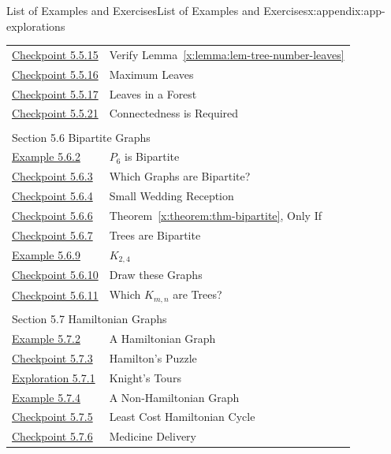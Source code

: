 \documentclass[oneside,10pt,]{book}
\newcommand{\xreffont}{\relax}
\numberwithin{equation}{section}
\begin{document}
\begin{appendixptx}{List of Examples and Exercises}{}{List of Examples and Exercises}{}{}{x:appendix:app-explorations}
\begin{longtable}[l]{ll}
\hyperref[x:exercise:ex-verify-lemma-leaves]{Checkpoint 5.5.15}& Verify Lemma~{\xreffont\ref*{x:lemma:lem-tree-number-leaves}}\\
\hyperref[x:exercise:ex-max-leaves]{Checkpoint 5.5.16}& Maximum Leaves\\
\hyperref[x:exercise:ex-min-max-leaves-forest]{Checkpoint 5.5.17}& Leaves in a Forest\\
\hyperref[x:exercise:ex-not-a-tree]{Checkpoint 5.5.21}& Connectedness is Required\\
\multicolumn{2}{l}{\null}\\[1.5ex] \multicolumn{2}{l}{\large Section 5.6 Bipartite Graphs}\\[0.5ex]
\hyperref[x:example:eg-bipartite]{Example 5.6.2}& \(P_6\) is Bipartite\\
\hyperref[x:exercise:ex-which-bipartite]{Checkpoint 5.6.3}& Which Graphs are Bipartite?\\
\hyperref[x:exercise:ex-explain-g8-bipartite]{Checkpoint 5.6.4}& Small Wedding Reception\\
\hyperref[x:exercise:ex-bipartite-only-if]{Checkpoint 5.6.6}& Theorem~{\xreffont\ref*{x:theorem:thm-bipartite}}, Only If\\
\hyperref[x:exercise:ex-tree-bipartite]{Checkpoint 5.6.7}& Trees are Bipartite\\
\hyperref[x:example:eg-complete-bipartite]{Example 5.6.9}& \(K_{2,4}\)\\
\hyperref[x:exercise:ex-draw-complete-bipartite]{Checkpoint 5.6.10}& Draw these Graphs\\
\hyperref[x:exercise:ex-which-Kmn-are-trees]{Checkpoint 5.6.11}& Which \(K_{m,n}\) are Trees?\\
\multicolumn{2}{l}{\null}\\[1.5ex] \multicolumn{2}{l}{\large Section 5.7 Hamiltonian Graphs}\\[0.5ex]
\hyperref[x:example:eg-hamiltonian]{Example 5.7.2}& A Hamiltonian Graph\\
\hyperref[x:exercise:ex-find-hamiltonian]{Checkpoint 5.7.3}& Hamilton's Puzzle\\
\hyperref[x:exploration:expl-knights-tour]{Exploration 5.7.1}& Knight's Tours\\
\hyperref[x:example:eg-not-hamiltonian]{Example 5.7.4}& A Non-Hamiltonian Graph\\
\hyperref[x:exercise:ex-find-least-cost-hamiltonian]{Checkpoint 5.7.5}& Least Cost Hamiltonian Cycle\\
\hyperref[x:exercise:ex-hamiltonian-]{Checkpoint 5.7.6}& Medicine Delivery\\

\end{longtable}
\end{appendixptx}
\end{document}
